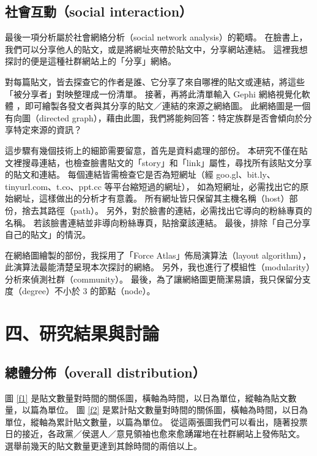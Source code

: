 \documentclass[letterpaper, 10pt, conference]{ieeeconf}   %
\begin{document}
\begin{CJK}{UTF8}{bsmi}
\subsection*{社會互動（social interaction）}

最後一項分析屬於社會網絡分析（social network analysis）的範疇。%
在臉書上，我們可以分享他人的貼文，或是將網址夾帶於貼文中，分享網站連結。%
這裡我想探討的便是這種社群網站上的「分享」網絡。%

對每篇貼文，皆去探查它的作者是誰、它分享了來自哪裡的貼文或連結，將這些「被分享者」對映整理成一份清單。%
接著，再將此清單輸入 Gephi 網絡視覺化軟體 \cite{c15}，即可繪製各發文者與其分享的貼文／連結的來源之網絡圖。%
此網絡圖是一個有向圖（directed graph），藉由此圖，我們將能夠回答：特定族群是否會傾向於分享特定來源的資訊？%

這步驟有幾個技術上的細節需要留意，首先是資料處理的部份。%
本研究不僅在貼文裡搜尋連結，也檢查臉書貼文的「story」和「link」屬性，尋找所有該貼文分享的貼文和連結。%
每個連結皆需檢查它是否為短網址（經 goo.gl、bit.ly、tinyurl.com、t.co、ppt.cc 等平台縮短過的網址），%
如為短網址，必需找出它的原始網址，這樣做出的分析才有意義。%
所有網址皆只保留其主機名稱（host）部份，捨去其路徑（path）。%
另外，對於臉書的連結，必需找出它導向的粉絲專頁的名稱。%
若該臉書連結並非導向粉絲專頁，貼捨棄該連結。%
最後，排除「自己分享自己的貼文」的情況。%

在網絡圖繪製的部份，我採用了「Force Atlas」佈局演算法（layout algorithm），此演算法最能清楚呈現本次探討的網絡。%
另外，我也進行了模組性（modularity）分析來偵測社群（community）。%
最後，為了讓網絡圖更簡潔易讀，我只保留分支度（degree）不小於 3 的節點（node）。%

\section*{四、研究結果與討論}

\subsection*{總體分佈（overall distribution）}

圖 \ref{f1} 是貼文數量對時間的關係圖，橫軸為時間，以日為單位，縱軸為貼文數量，以篇為單位。%
圖 \ref{f2} 是累計貼文數量對時間的關係圖，橫軸為時間，以日為單位，縱軸為累計貼文數量，以篇為單位。%
從這兩張圖我們可以看出，隨著投票日的接近，各政黨／侯選人／意見領袖也愈來愈踴躍地在社群網站上發佈貼文。%
選舉前幾天的貼文數量更達到其餘時間的兩倍以上。%


\end{CJK}
\end{document}
